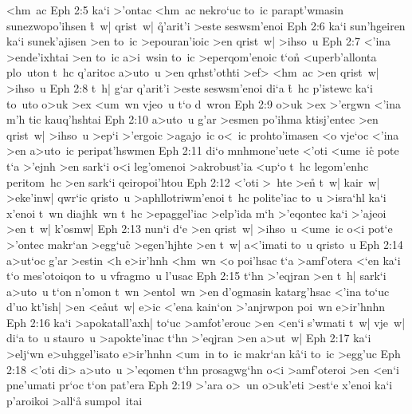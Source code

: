 <hm~ac\bibvsend
\vs Eph 2:5
ka`i
>'ontac
<hm~ac
nekro`uc
to~ic
parapt'wmasin
sunezwopo'ihsen
\r{t}~w|
qrist~w|
\r{q}'arit'i
>este
seswsm'enoi\bibvsend
\vs Eph 2:6
ka`i
sun'hgeiren
ka`i
sunek'ajisen
>en
to~ic
>epouran'ioic
>en
qrist~w|
>ihso~u\bibvsend
\vs Eph 2:7
<'ina
>ende'ixhtai
>en
to~ic
a>i~wsin
to~ic
>eperqom'enoic
t`on\r{}
<uperb'allonta
plo~uton
t~hc
q'aritoc
a>uto~u
>en
qrhst'othti
>ef>
<hm~ac
>en
qrist~w|
>ihso~u\bibvsend
\vs Eph 2:8
t~h|
g`ar
q'arit'i
>este
seswsm'enoi
di`a
\r{t}~hc
p'istewc
ka`i
to~uto
o>uk
>ex
<um~wn
vjeo~u
t`o
d~wron\bibvsend
\vs Eph 2:9
o>uk
>ex
>'ergwn
<'ina
m'h
tic
kauq'hshtai\bibvsend
\vs Eph 2:10
a>uto~u
g'ar
>esmen
po'ihma
ktisj'entec
>en
qrist~w|
>ihso~u
>ep`i
>'ergoic
>agajo~ic
o<~ic
prohto'imasen
<o
vje`oc
<'ina
>en
a>uto~ic
peripat'hswmen\bibvsend
\vs Eph 2:11
di`o
mnhmone'uete
<'oti
<ume~ic\r{}
pote
t`a
>'ejnh
>en
sark`i
o<i
leg'omenoi
>akrobust'ia
<up`o
t~hc
legom'enhc
peritom~hc
>en
sark`i
qeiropoi'htou\bibvsend
\vs Eph 2:12
<'oti
>~hte
>e\r{n}
t~w|
kair~w|
>eke'inw|
qwr`ic
qristo~u
>aphllotriwm'enoi
t~hc
polite'iac
to~u
>isra`hl
ka`i
x'enoi
t~wn
diajhk~wn
t~hc
>epaggel'iac
>elp'ida
m`h
>'eqontec
ka`i
>'ajeoi
>en
t~w|
k'osmw|\bibvsend
\vs Eph 2:13
nun`i
d`e
>en
qrist~w|
>ihso~u
<ume~ic
o<i
pot`e
>'ontec
makr`an
>egg`uc\r{}
>egen'hjhte
>en
t~w|
a<'imati
to~u
qristo~u\bibvsend
\vs Eph 2:14
a>ut`oc
g'ar
>estin
<h
e>ir'hnh
<hm~wn
<o
poi'hsac
t`a
>amf'otera
<`en
ka`i
t`o
mes'otoiqon
to~u
vfragmo~u
l'usac\bibvsend
\vs Eph 2:15
t`hn
>'eqjran
>en
t~h|
sark`i
a>uto~u
t`on
n'omon
t~wn
>entol~wn
>en
d'ogmasin
katarg'hsac
<'ina
to`uc
d'uo
kt'ish|
>en
<e\r{a}ut~w|
e>ic
<'ena
kain`on
>'anjrwpon
poi~wn
e>ir'hnhn\bibvsend
\vs Eph 2:16
ka`i
>apokatall'axh|
to`uc
>amfot'erouc
>en
<en`i
s'wmati
t~w|
vje~w|
di`a
to~u
stauro~u
>apokte'inac
t`hn
>'eqjran
>en
a>ut~w|\bibvsend
\vs Eph 2:17
ka`i
>elj`wn
e>uhggel'isato
e>ir'hnhn
<um~in
to~ic
makr`an
k\r{a}`i
to~ic
>egg'uc\bibvsend
\vs Eph 2:18
<'oti
di>
a>uto~u
>'eqomen
t`hn
prosagwg`hn
o<i
>amf'oteroi
>en
<en`i
pne'umati
pr`oc
t`on
pat'era\bibvsend
\vs Eph 2:19
>'ara
o>~un
o>uk'eti
>est`e
x'enoi
ka`i
p'aroikoi
>all`a\r{}
sumpol~itai
